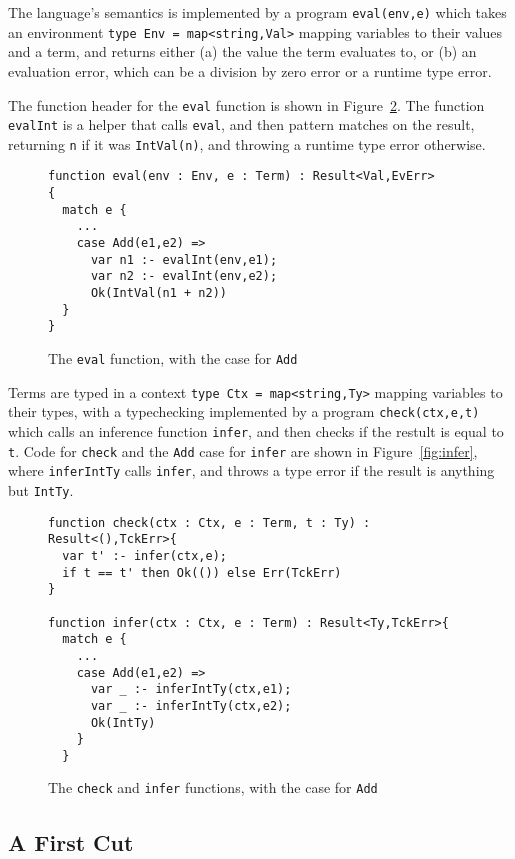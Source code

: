 \documentclass[sigplan,review,screen,anonymous]{acmart}
\begin{document}
The language's semantics is implemented by a program \texttt{eval(env,e)} which takes an environment \texttt{type
Env = map<string,Val>} mapping variables to their values and a term, and returns
either (a) the value the term evaluates to, or (b) an evaluation error, which can be a
division by zero error or a runtime type error.

The function header for the \texttt{eval} function is shown in Figure~\ref{fig:eval}.
The function \texttt{evalInt} is a helper that calls \texttt{eval}, and then pattern matches on the result,
returning \texttt{n} if it was \texttt{IntVal(n)}, and throwing a runtime type error otherwise.

\begin{figure}
  \begin{verbatim}
function eval(env : Env, e : Term) : Result<Val,EvErr>
{
  match e {
    ...
    case Add(e1,e2) =>
      var n1 :- evalInt(env,e1);
      var n2 :- evalInt(env,e2);
      Ok(IntVal(n1 + n2))
  }
}
  \end{verbatim}
  \caption{The \texttt{eval} function, with the case for \texttt{Add}}
  \label{fig:eval}
\end{figure}


Terms are typed in a context \texttt{type Ctx = map<string,Ty>} mapping variables to their types,
with a typechecking implemented by a program \texttt{check(ctx,e,t)} which calls an inference function \texttt{infer}, and then checks if the restult is equal to \texttt{t}.
Code for \texttt{check} and the \texttt{Add} case for \texttt{infer} are shown in Figure~\ref{fig:infer}, where
\texttt{inferIntTy} calls \texttt{infer}, and throws a type error if the result
is anything but \texttt{IntTy}.

\begin{figure}
\begin{verbatim}
function check(ctx : Ctx, e : Term, t : Ty) : Result<(),TckErr>{
  var t' :- infer(ctx,e);
  if t == t' then Ok(()) else Err(TckErr)
}

function infer(ctx : Ctx, e : Term) : Result<Ty,TckErr>{
  match e {
    ...
    case Add(e1,e2) =>
      var _ :- inferIntTy(ctx,e1);
      var _ :- inferIntTy(ctx,e2);
      Ok(IntTy)
    }
  }
\end{verbatim}
\caption{The \texttt{check} and \texttt{infer} functions, with the case for \texttt{Add}}
\label{fig:eval}
\end{figure}



\subsection*{A First Cut}
\end{document}
